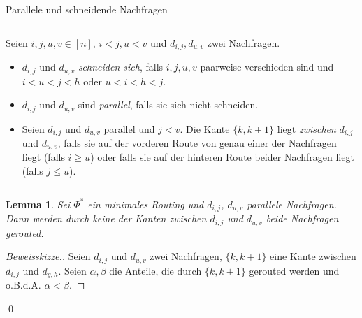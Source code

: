 \documentclass[8pt]{beamer}
\theoremstyle{claim}
\newtheorem{mylemma}[theorem]{Lemma}
\begin{document}
	\begin{frame}{Parallele und schneidende Nachfragen}
		\begin{columns}
		\begin{definition}
			Seien $i, j, u, v \in [n]$, $i < j, u < v$ und $d_{i,j}, d_{u, v}$ zwei Nachfragen.
			\begin{itemize}
				\item<1-> $d_{i, j}$ und $d_{u, v}$ \emph{schneiden sich}, falls $i, j, u, v$ paarweise verschieden sind und $i < u < j < h$ oder $u < i < h < j$.
				\item<2-> $d_{i, j}$ und $d_{u, v}$ sind \emph{parallel}, falls sie sich nicht schneiden.
				\item<3-> Seien $d_{i, j}$ und $d_{u, v}$ parallel und $j < v$.
				Die Kante $\{k, k+1\}$ liegt \emph{zwischen} $d_{i,j}$ und $d_{u, v}$, falls sie auf der vorderen Route von genau einer der Nachfragen liegt (falls $i \geq u$) oder falls sie auf der hinteren Route beider Nachfragen liegt (falls $j \leq u$).
			\end{itemize}
		\end{definition}
		\end{columns}
	\end{frame}

	\begin{frame}
		\begin{mylemma}
			Sei $\Phi^\ast$ ein minimales Routing und $d_{i, j}$, $d_{u, v}$ parallele Nachfragen.
			Dann werden durch keine der Kanten zwischen $d_{i, j}$ und $d_{u, v}$ beide Nachfragen gerouted.
		\end{mylemma}
		\vspace{5mm}
		\begin{proof}[Beweisskizze.]\let\qed\relax
			Seien $d_{i, j}$ und $d_{u, v}$ zwei Nachfragen, $\{k, k+1\}$ eine Kante zwischen $d_{i, j}$ und $d_{g, h}$.
			Seien $\alpha, \beta$ die Anteile, die durch $\{k, k+1\}$ gerouted werden und o.B.d.A. $\alpha < \beta$.
		\end{proof}
		\begin{center}
			\begin{minipage}{0.4\linewidth}
					
			\end{minipage}
			\hspace{1.3cm}
			\begin{minipage}{0.4\linewidth}
				
			\end{minipage}	
		\end{center}
		\qed
	\end{frame}
\end{document}
